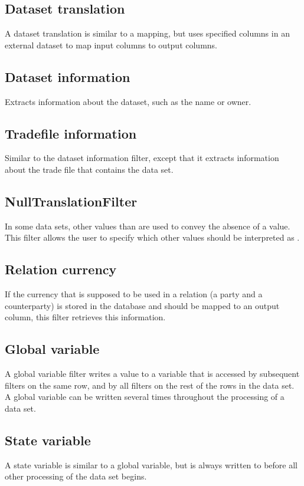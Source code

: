 \subsection{Dataset translation}
A dataset translation is similar to a mapping, but uses specified columns in an external dataset to map input columns to output columns.

\subsection{Dataset information}
Extracts information about the dataset, such as the name or owner.

\subsection{Tradefile information}
Similar to the dataset information filter, except that it extracts information about the trade file that contains the data set.

\subsection{NullTranslationFilter}
In some data sets, other values than  are used to convey the absence of a value. This filter allows the user to specify which other values
should be interpreted as .

\subsection{Relation currency}
If the currency that is supposed to be used in a relation (a party and a counterparty) is stored in the database and should be mapped to an output column, this
filter retrieves this information.

\subsection{Global variable}
A global variable filter writes a value to a variable that is accessed by subsequent filters on the same row, and by all filters on the rest of the rows in the data
set. A global variable can be written several times throughout the processing of a data set.

\subsection{State variable}
A state variable is similar to a global variable, but is always written to before all other processing of the data set begins.

